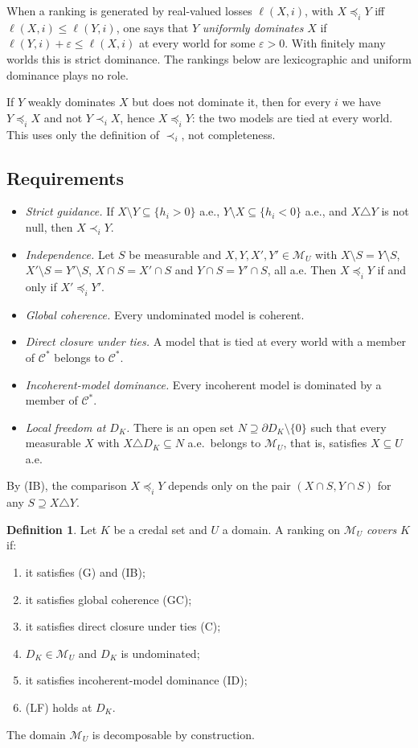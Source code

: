 \documentclass[11pt]{article}
\newcommand{\M}{\mathcal{M}}
\theoremstyle{plain}
\theoremstyle{definition}
\newtheorem{definition}[theorem]{Definition}
\theoremstyle{remark}
\begin{document}
When a ranking is generated by real-valued losses $\ell(X,i)$, with $X\preceq_iY$ iff
$\ell(X,i)\le\ell(Y,i)$, one says that $Y$ \emph{uniformly dominates} $X$ if
$\ell(Y,i)+\varepsilon\le\ell(X,i)$ at every world for some $\varepsilon>0$. With finitely
many worlds this is strict dominance. The rankings below are lexicographic and uniform
dominance plays no role.

If $Y$ weakly dominates $X$ but does not dominate it, then for every $i$ we have
$Y\preceq_iX$ and not $Y\prec_iX$, hence $X\preceq_iY$: the two models are tied at every
world. This uses only the definition of $\prec_i$, not completeness.

\subsection{Requirements}

\begin{itemize}
  \item[(G)] \emph{Strict guidance.} If $X\setminus Y\subseteq\{h_i>0\}$ a.e.,
  $Y\setminus X\subseteq\{h_i<0\}$ a.e., and $X\triangle Y$ is not null, then
  $X\prec_iY$.
  \item[(IB)] \emph{Independence.} Let $S$ be measurable and $X,Y,X',Y'\in\M_U$ with
  $X\setminus S=Y\setminus S$, $X'\setminus S=Y'\setminus S$, $X\cap S=X'\cap S$ and
  $Y\cap S=Y'\cap S$, all a.e. Then $X\preceq_iY$ if and only if $X'\preceq_iY'$.
  \item[(GC)] \emph{Global coherence.} Every undominated model is coherent.
  \item[(C)] \emph{Direct closure under ties.} A model that is tied at every world with a
  member of $\mathcal C^\ast$ belongs to $\mathcal C^\ast$.
  \item[(ID)] \emph{Incoherent-model dominance.} Every incoherent model is dominated by a
  member of $\mathcal C^\ast$.
  \item[(LF)] \emph{Local freedom at $D_K$.} There is an open set $N\supseteq\partial
  D_K\setminus\{0\}$ such that every measurable $X$ with $X\triangle D_K\subseteq N$ a.e.\
  belongs to $\M_U$, that is, satisfies $X\subseteq U$ a.e.
\end{itemize}
By (IB), the comparison $X\preceq_iY$ depends only on the pair $(X\cap S,Y\cap S)$ for any
$S\supseteq X\triangle Y$.

\begin{definition}\label{def:cover}
Let $K$ be a credal set and $U$ a domain. A ranking on $\M_U$ \emph{covers} $K$ if:
\begin{enumerate}[label=(\roman*)]
  \item it satisfies (G) and (IB);
  \item it satisfies global coherence (GC);
  \item it satisfies direct closure under ties (C);
  \item $D_K\in\M_U$ and $D_K$ is undominated;
  \item it satisfies incoherent-model dominance (ID);
  \item (LF) holds at $D_K$.
\end{enumerate}
The domain $\M_U$ is decomposable by construction.
\end{definition}
\end{document}
